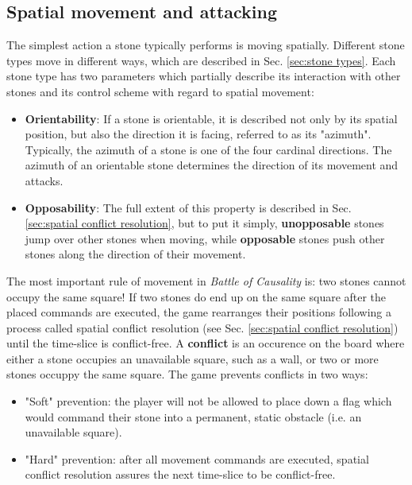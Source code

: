 \documentclass[12pt]{article}
\begin{document}
	\subsection{Spatial movement and attacking}
	The simplest action a stone typically performs is moving spatially. Different stone types move in different ways, which are described in Sec. \ref{sec:stone types}. Each stone type has two parameters which partially describe its interaction with other stones and its control scheme with regard to spatial movement:
	\begin{itemize}
	\item \textbf{Orientability}: If a stone is orientable, it is described not only by its spatial position, but also the direction it is facing, referred to as its "azimuth". Typically, the azimuth of a stone is one of the four cardinal directions. The azimuth of an orientable stone determines the direction of its movement and attacks.
	\item \textbf{Opposability}: The full extent of this property is described in Sec. \ref{sec:spatial conflict resolution}, but to put it simply, \textbf{unopposable} stones jump over other stones when moving, while \textbf{opposable} stones push other stones along the direction of their movement.
	\end{itemize}
	The most important rule of movement in \textit{Battle of Causality} is: two stones cannot occupy the same square! If two stones do end up on the same square after the placed commands are executed, the game rearranges their positions following a process called spatial conflict resolution (see Sec. \ref{sec:spatial conflict resolution}) until the time-slice is conflict-free. A \textbf{conflict} is an occurence on the board where either a stone occupies an unavailable square, such as a wall, or two or more stones occuppy the same square. The game prevents conflicts in two ways:
	\begin{itemize}
	\item "Soft" prevention: the player will not be allowed to place down a flag which would command their stone into a permanent, static obstacle (i.e. an unavailable square).
	\item "Hard" prevention: after all movement commands are executed, spatial conflict resolution assures the next time-slice to be conflict-free.
	\end{itemize}
	
\end{document}
